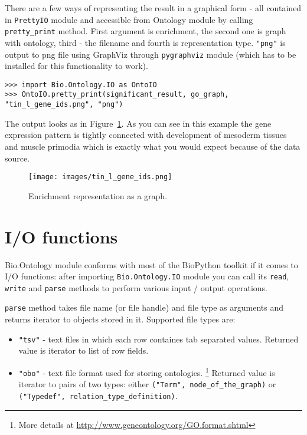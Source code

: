 There are a few ways of representing the result in a graphical form - all
contained in \verb|PrettyIO| module and accessible from Ontology module by
calling \verb|pretty_print| method. First argument is enrichment, the
second one is graph with ontology, third - the filename and fourth is
representation type. \verb|"png"| is output to png file using GraphViz through
\verb|pygraphviz| module (which has to be installed for this functionality to
work).

\begin{verbatim}
>>> import Bio.Ontology.IO as OntoIO
>>> OntoIO.pretty_print(significant_result, go_graph, "tin_l_gene_ids.png", "png")
\end{verbatim}

The output looks as in Figure~\ref{fig:graphoutput}. As you can see in this example
the gene expression pattern is tightly connected with development of 
mesoderm tissues and muscle primodia which is exactly what you would expect
because of the data source.

\begin{htmlonly}
\label{fig:graphoutput}
\end{htmlonly}

\begin{latexonly}
\begin{figure}[htbp]
\centering
\texttt{[image: images/tin\_l\_gene\_ids.png]}
\caption{Enrichment representation as a graph.}
\label{fig:graphoutput}
\end{figure}
\end{latexonly}

\section{I/O functions}

Bio.Ontology module conforms with most of the BioPython toolkit if it comes to
I/O functions: after importing \verb|Bio.Ontology.IO| module you can call its
\verb|read|, \verb|write| and \verb|parse| methods to
perform various input / output operations.

\verb|parse| method takes file name (or file handle) and file type as arguments
and returns iterator to objects stored in it.
Supported file types are:
\begin{itemize}
\item \verb|"tsv"| - text files in which each row containes tab separated values. Returned
value is iterator to list of row fields.
\item \verb|"obo"| - text file format used for storing ontologies. \footnote{More details at
\url{http://www.geneontology.org/GO.format.shtml}}
Returned value is iterator to pairs of two types: either
\verb|("Term", node_of_the_graph)| or \verb|("Typedef", relation_type_definition)|.
\end{itemize}


